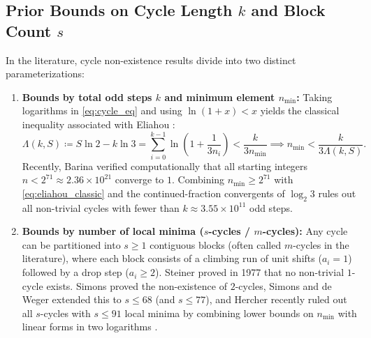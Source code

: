 \documentclass[11pt, a4paper]{amsart}
\theoremstyle{definition}
\begin{document}
\subsection{Prior Bounds on Cycle Length $k$ and Block Count $s$}
In the literature, cycle non-existence results divide into two distinct parameterizations:
\begin{enumerate}
    \item \textbf{Bounds by total odd steps $k$ and minimum element $n_{\min}$:} Taking logarithms in \eqref{eq:cycle_eq} and using $\ln(1 + x) < x$ yields the classical inequality associated with Eliahou \cite{Eliahou1993}:
    \begin{equation}\label{eq:eliahou_classic}
    \Lambda(k, S) \coloneqq S \ln 2 - k \ln 3 = \sum_{i=0}^{k-1} \ln\left(1 + \frac{1}{3n_i}\right) < \frac{k}{3 n_{\min}} \implies n_{\min} < \frac{k}{3 \Lambda(k, S)}.
    \end{equation}
    Recently, Barina \cite{Barina2025} verified computationally that all starting integers $n < 2^{71} \approx 2.36 \times 10^{21}$ converge to $1$. Combining $n_{\min} \ge 2^{71}$ with \eqref{eq:eliahou_classic} and the continued-fraction convergents of $\log_2 3$ rules out all non-trivial cycles with fewer than $k \approx 3.55 \times 10^{11}$ odd steps.
    \item \textbf{Bounds by number of local minima ($s$-cycles / $m$-cycles):} Any cycle can be partitioned into $s \ge 1$ contiguous blocks (often called $m$-cycles in the literature), where each block consists of a climbing run of unit shifts ($a_i = 1$) followed by a drop step ($a_i \ge 2$). Steiner \cite{Steiner1977} proved in 1977 that no non-trivial $1$-cycle exists. Simons \cite{Simons2005} proved the non-existence of $2$-cycles, Simons and de Weger \cite{SimonsDeWeger2005} extended this to $s \le 68$ (and $s \le 77$), and Hercher \cite{Hercher2023} recently ruled out all $s$-cycles with $s \le 91$ local minima by combining lower bounds on $n_{\min}$ with linear forms in two logarithms \cite{Laurent1995, Rhin1987}.
\end{enumerate}
\end{document}
